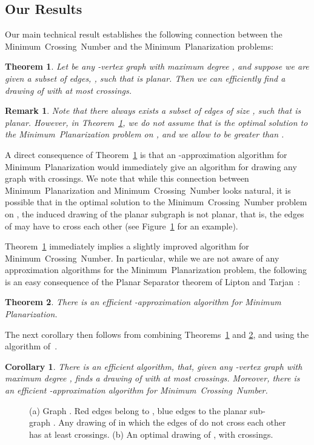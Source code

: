 \documentclass[twoside,leqno,twocolumn]{article}
\newtheorem{remark}{Remark}[section]
\newtheorem{remark}{Remark}
\newtheorem{theorem}{Theorem}
\newtheorem{corollary}{Corollary}
\newcommand{\MP}{\mbox{\sf Minimum Planarization}\xspace}
\newcommand{\MCN}{\mbox{\sf Minimum Crossing Number}\xspace}
\begin{document}
\subsection{Our Results}
Our main technical result establishes the following connection between the \MCN and the \MP problems:

\begin{theorem}\label{thm:main}
Let  be any -vertex graph with maximum degree , and suppose we are given a subset  of edges, , such that  is planar. Then we can efficiently find a drawing of  with at most  crossings.
\end{theorem}
\begin{remark}
Note that there always exists a subset  of edges of size , such that  is planar.
However, in Theorem~\ref{thm:main}, we do not assume that  is the optimal solution to the \MP problem on , and we allow
 to be greater than .
\end{remark}


A direct consequence of Theorem~\ref{thm:main} is that an -approximation algorithm for \MP would immediately give an algorithm for drawing any graph  with  crossings. We note that while this connection between \MP and \MCN looks natural, it is possible that in the optimal solution  to the \MCN problem on , the induced drawing of the planar subgraph  is not planar, that is, the edges of  may have to cross each other (see Figure~\ref{fig: example} for an example).

Theorem~\ref{thm:main} immediately implies a slightly improved algorithm for \MCN. In particular, while we are not aware of any approximation algorithms for the \MP problem, the following is an easy consequence of the Planar Separator theorem of Lipton and Tarjan~\cite{planar-separator}:
\begin{theorem}\label{thm:sqrt n}
There is an efficient -approximation algorithm for {\sf Minimum Planarization}.
\end{theorem}
The next corollary then follows from combining Theorems~\ref{thm:main} and \ref{thm:sqrt n}, and using the algorithm of~\cite{EvenGS02}.
\begin{corollary}\label{corollary:result for general graphs}
There is an efficient algorithm, that, given any -vertex graph  with maximum degree , finds a drawing of  with at most  crossings. Moreover,  there is an efficient -approximation algorithm for \MCN.
\end{corollary} 

\begin{figure}[h]
\begin{center}
 \caption{(a) Graph . Red edges belong to , blue edges to the planar sub-graph . Any drawing of  in which the edges of  do not cross each other has at least  crossings. (b) An optimal drawing of , with  crossings.} \label{fig: example}
\end{center}
\end{figure}
\end{document}
